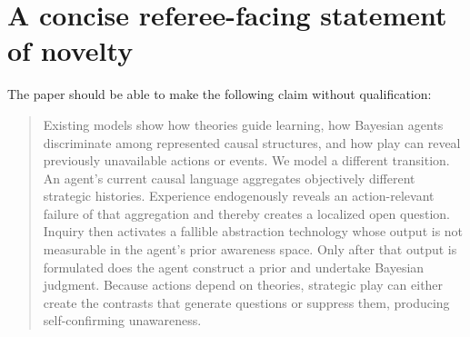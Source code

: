 \documentclass[11pt]{article}
\begin{document}
	\section{A concise referee-facing statement of novelty}
	
	The paper should be able to make the following claim without qualification:
	
	\begin{quote}
		Existing models show how theories guide learning, how Bayesian agents discriminate among represented causal structures, and how play can reveal previously unavailable actions or events.  We model a different transition.  An agent's current causal language aggregates objectively different strategic histories.  Experience endogenously reveals an action-relevant failure of that aggregation and thereby creates a localized open question.  Inquiry then activates a fallible abstraction technology whose output is not measurable in the agent's prior awareness space.  Only after that output is formulated does the agent construct a prior and undertake Bayesian judgment.  Because actions depend on theories, strategic play can either create the contrasts that generate questions or suppress them, producing self-confirming unawareness.
	\end{quote}
	
\end{document}
